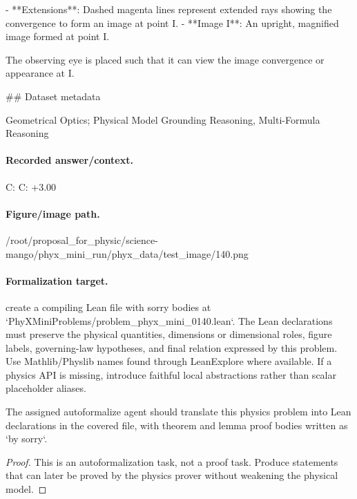 - **Extensions**: Dashed magenta lines represent extended rays showing the convergence to form an image at point I.
- **Image I**: An upright, magnified image formed at point I.

The observing eye is placed such that it can view the image convergence or appearance at I.

\#\# Dataset metadata

Geometrical Optics; Physical Model Grounding Reasoning, Multi-Formula Reasoning

\paragraph{Recorded answer/context.}
C: C: +3.00

\paragraph{Figure/image path.}
/root/proposal\_for\_physic/science-mango/phyx\_mini\_run/phyx\_data/test\_image/140.png

\paragraph{Formalization target.}
create a compiling Lean file with sorry bodies at `PhyXMiniProblems/problem\_phyx\_mini\_0140.lean`. The Lean declarations must preserve the physical quantities, dimensions or dimensional roles, figure labels, governing-law hypotheses, and final relation expressed by this problem.
Use Mathlib/Physlib names found through LeanExplore where available. If a physics API is missing, introduce faithful local abstractions rather than scalar placeholder aliases.

\begin{theorem}
\label{thm:physics:phyx_mini_0140:target}
The assigned autoformalize agent should translate this physics problem into Lean declarations in the covered file, with theorem and lemma proof bodies written as `by sorry`.
\end{theorem}
\begin{proof}
This is an autoformalization task, not a proof task. Produce statements that can later be proved by the physics prover without weakening the physical model.
\end{proof}

